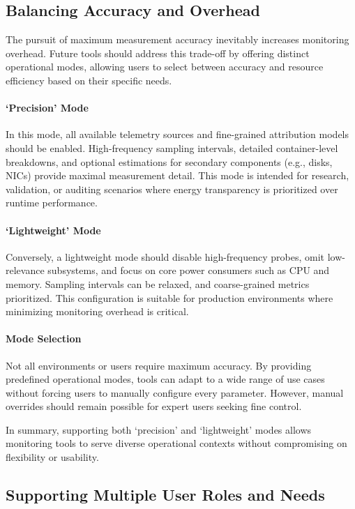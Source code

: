 \subsection{Balancing Accuracy and Overhead}
\label{sec:future-accuracy-overhead}

The pursuit of maximum measurement accuracy inevitably increases monitoring overhead. Future tools should address this trade-off by offering distinct operational modes, allowing users to select between accuracy and resource efficiency based on their specific needs.

\paragraph{‘Precision’ Mode}
In this mode, all available telemetry sources and fine-grained attribution models should be enabled. High-frequency sampling intervals, detailed container-level breakdowns, and optional estimations for secondary components (e.g., disks, NICs) provide maximal measurement detail. This mode is intended for research, validation, or auditing scenarios where energy transparency is prioritized over runtime performance.

\paragraph{‘Lightweight’ Mode}
Conversely, a lightweight mode should disable high-frequency probes, omit low-relevance subsystems, and focus on core power consumers such as CPU and memory. Sampling intervals can be relaxed, and coarse-grained metrics prioritized. This configuration is suitable for production environments where minimizing monitoring overhead is critical.

\paragraph{Mode Selection}
Not all environments or users require maximum accuracy. By providing predefined operational modes, tools can adapt to a wide range of use cases without forcing users to manually configure every parameter. However, manual overrides should remain possible for expert users seeking fine control.

In summary, supporting both ‘precision’ and ‘lightweight’ modes allows monitoring tools to serve diverse operational contexts without compromising on flexibility or usability.

\subsection{Supporting Multiple User Roles and Needs}
\label{sec:future-user-roles}

